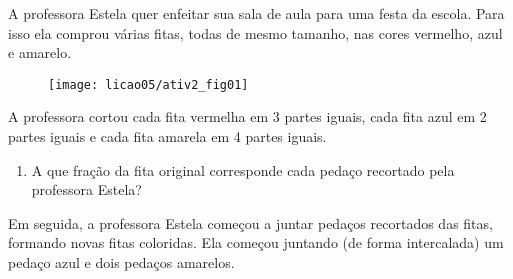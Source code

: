 \begin{atividade}{}\label{chap5-ativ2}


A professora Estela quer enfeitar sua sala de aula para uma festa da escola. Para isso ela comprou várias fitas, todas de mesmo tamanho, nas cores vermelho, azul e amarelo.


\begin{figure}[H]
\centering

\texttt{[image: licao05/ativ2\_fig01]}
\end{figure}

A professora cortou cada fita vermelha em 3 partes iguais, cada fita azul em 2 partes iguais e cada fita amarela em 4 partes iguais.

\begin{center}
\end{center}

\begin{enumerate}  %
  \item     A que fração da fita original corresponde cada pedaço recortado pela professora Estela?
 \end{enumerate}

 Em seguida, a professora Estela começou a juntar pedaços recortados das fitas, formando novas fitas coloridas. Ela começou juntando (de forma intercalada) um pedaço azul e dois pedaços amarelos.

\begin{center}
\end{center}


\end{atividade}
